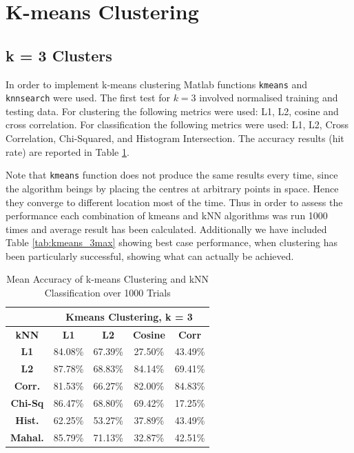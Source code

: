 \documentclass[10pt,twocolumn,letterpaper]{article}
\begin{document}
\section{K-means Clustering}
\subsection{k = 3 Clusters}
In order to implement k-means clustering Matlab functions {\tt\small kmeans} and {\tt\small knnsearch} were used. The first test for $k=3$ involved normalised training and testing data. For clustering the following metrics were used: L1, L2, cosine and cross correlation.
For classification the following metrics were used: L1, L2, Cross Correlation, Chi-Squared, and Histogram Intersection. The accuracy results (hit rate) are reported in Table \ref{tab:kmeans3}.

Note that {\tt\small kmeans} function does not produce the same results every time, since the algorithm beings by placing the centres at arbitrary points in space. Hence they converge to different location most of the time. Thus in order to assess the performance each combination of kmeans and kNN algorithms was run 1000 times and average result has been calculated. Additionally we have included Table \ref{tab:kmeans_3max} showing best case performance, when clustering has been particularly successful, showing what can actually be achieved.

\begin{table}[H]
\caption{Mean Accuracy of k-means Clustering and kNN Classification over 1000 Trials \label{tab:kmeans3}}
\footnotesize
\begin{center}
\begin{tabular}{|c| c c c c|}
\cline{2-5}
\multicolumn{1}{c|}{ } & \multicolumn{4}{|c|}{\bf Kmeans Clustering, k = 3} \\
\hline

\bf kNN &\bf L1 &\bf L2 &\bf Cosine &\bf Corr \\ [0.5ex]
\hline
\bf L1 & 84.08\% & 67.39\%  & 27.50\% & 43.49\%\\ [0.5ex]
\hline
\bf L2 & 87.78\% & 68.83\%  & 84.14\% & 69.41\%\\ [0.5ex]
\hline
\bf Corr. & 81.53\% & 66.27\%  & 82.00\% & 84.83\%\\ [0.5ex]
\hline
\bf Chi-Sq & 86.47\% & 68.80\%  & 69.42\% & 17.25\%\\ [0.5ex]
\hline
\bf Hist. & 62.25\% & 53.27\%  & 37.89\% & 43.49\%\\ [0.5ex]
\hline
\bf Mahal. & 85.79\% & 71.13\% & 32.87\% & 42.51\% \\ [0.5ex]
\hline
\end{tabular}
\end{center}
\end{table}
\end{document}
